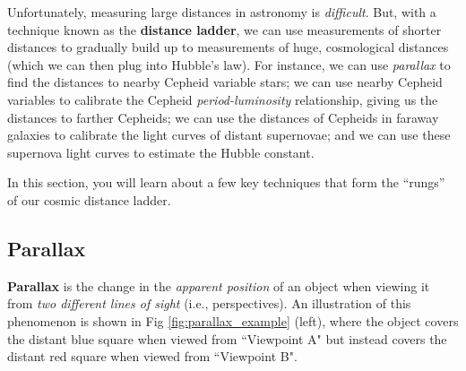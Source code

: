 \documentclass[11pt]{article}
\begin{document}
\medskip \noindent
Unfortunately, measuring large distances in astronomy is \emph{difficult}. But, with a technique known as the \textbf{distance ladder}, we can use measurements of shorter distances to gradually build up to measurements of huge, cosmological distances (which we can then plug into Hubble's law). For instance, we can use \emph{parallax} to find the distances to nearby Cepheid variable stars; we can use nearby Cepheid variables to calibrate the Cepheid \emph{period-luminosity} relationship, giving us the distances to farther Cepheids; we can use the distances of Cepheids in faraway galaxies to calibrate the light curves of distant supernovae; and we can use these supernova light curves to estimate the Hubble constant.

\medskip \noindent
In this section, you will learn about a few key techniques that form the ``rungs'' of our cosmic distance ladder.

\subsection{Parallax}

\textbf{Parallax} is the change in the \textsl{apparent position} of an object when viewing it from \textsl{two different lines of sight} (i.e., perspectives). An illustration of this phenomenon is shown in Fig \ref{fig:parallax_example} (left), where the object covers the distant blue square when viewed from ``Viewpoint A" but instead covers the distant red square when viewed from ``Viewpoint B".
\end{document}

